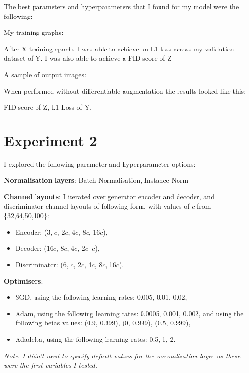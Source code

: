 \documentclass{UoYCSproject}
\begin{document}
The best parameters and hyperparameters that I found for my model were the following:

My training graphs:

After X training epochs I was able to achieve an L1 loss across my validation dataset of Y.
I was also able to achieve a FID score of Z

A sample of output images:

When performed without differentiable augmentation the results looked like this:

FID score of Z, L1 Loss of Y.

\section{Experiment 2}

I explored the following parameter and hyperparameter options:

\textbf{Normalisation layers}: Batch Normalisation, Instance Norm

\textbf{Channel layouts}:
I iterated over generator encoder and decoder, and discriminator channel layouts of following form, with values of $c$ from \{32,64,50,100\}:
\begin{itemize}
\item Encoder: (3, $c$, 2$c$, 4$c$, 8$c$, 16$c$), 
\item Decoder: (16$c$, 8$c$, 4$c$, 2$c$, $c$),
\item Discriminator: (6, $c$, 2$c$, 4$c$, 8$c$, 16$c$).
\end{itemize}

\textbf{Optimisers}:
\begin{itemize}
\item SGD, using the following learning rates: 0.005, 0.01, 0.02,
\item Adam, using the following learning rates: 0.0005, 0.001, 0.002, and using the following betas values: (0.9, 0.999), (0, 0.999), (0.5, 0.999),
\item Adadelta, using the following learning rates: 0.5, 1, 2.
\end{itemize}

\emph{Note: I didn't need to specify default values for the normalisation layer as these were the first variables I tested.}
\end{document}
